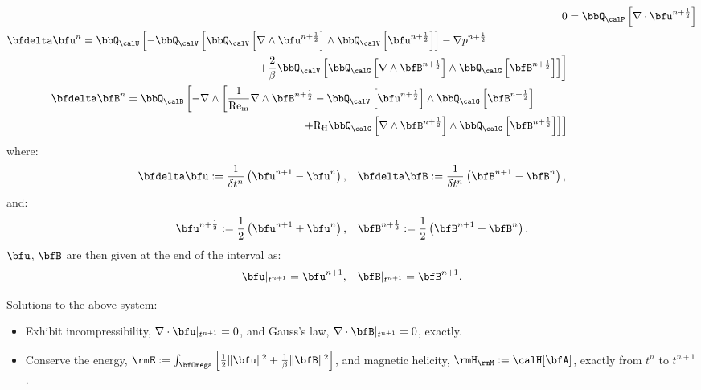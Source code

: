     \begin{align}
                           0  &=  \bbQ_{\calP}\left[\nabla\cdot\bfu^{n + \frac{1}{2}}\right]  \\
        \begin{split}
            \bfdelta\bfu^{n}  &=  \bbQ_{\calU}\left[- \bbQ_{\calV}\left[\bbQ_{\calV}\left[\nabla\wedge\bfu^{n + \frac{1}{2}}\right]\wedge\bbQ_{\calV}\left[\bfu^{n + \frac{1}{2}}\right]\right] - \nabla p^{n + \frac{1}{2}}\right.  \\
            &\qquad\qquad\qquad\qquad\qquad\qquad\qquad\qquad\left.+ \frac{2}{\beta}\bbQ_{\calV}\left[\bbQ_{\calG}\left[\nabla\wedge\bfB^{n + \frac{1}{2}}\right]\wedge\bbQ_{\calG}\left[\bfB^{n + \frac{1}{2}}\right]\right]\right]
        \end{split}  \\
        \begin{split}
            \bfdelta\bfB^{n}  &=  \bbQ_{\calB}\left[- \nabla\wedge\left[\frac{1}{\rmRem}\nabla\wedge\bfB^{n + \frac{1}{2}} - \bbQ_{\calV}\left[\bfu^{n + \frac{1}{2}}\right]\wedge\bbQ_{\calG}\left[\bfB^{n + \frac{1}{2}}\right]\right.\right.  \\
            &\qquad\qquad\qquad\qquad\qquad\qquad\qquad\qquad\left.\left.+ \rmRH\bbQ_{\calG}\left[\nabla\wedge\bfB^{n + \frac{1}{2}}\right]\wedge\bbQ_{\calG}\left[\bfB^{n + \frac{1}{2}}\right]\right]\right]
        \end{split}
    \end{align}
    where:
    \begin{align}
        \bfdelta\bfu  :=  \frac{1}{\delta t^{n}}\left(\bfu^{n + 1} - \bfu^{n}\right),  &&
        \bfdelta\bfB  :=  \frac{1}{\delta t^{n}}\left(\bfB^{n + 1} - \bfB^{n}\right),
    \end{align}
    and:
    \begin{align}
        \bfu^{n + \frac{1}{2}}  :=  \frac{1}{2}\left(\bfu^{n + 1} + \bfu^{n}\right),  &&
        \bfB^{n + \frac{1}{2}}  :=  \frac{1}{2}\left(\bfB^{n + 1} + \bfB^{n}\right).
    \end{align}
    $\bfu$, $\bfB$ are then given at the end of the interval as:
    \begin{align}
        \bfu|_{t^{n + 1}} = \bfu^{n + 1},  &&
        \bfB|_{t^{n + 1}} = \bfB^{n + 1}.
    \end{align}
    
    \shortline

    Solutions to the above system:
    \begin{itemize}
        \item  Exhibit incompressibility, $\nabla\cdot\bfu|_{t^{n + 1}}  =  0$, and Gauss's law, $\nabla\cdot\bfB|_{t^{n + 1}}  =  0$, exactly.
        \item  Conserve the energy, $\rmE  :=  \int_{\bfOmega}\left[\frac{1}{2}\|\bfu\|^{2} + \frac{1}{\beta}\|\bfB\|^{2}\right]$, and magnetic helicity, $\rmH_{\rmM}  :=  \calH[\bfA]$, exactly from $t^{n}$ to $t^{n + 1}$.
    \end{itemize}

